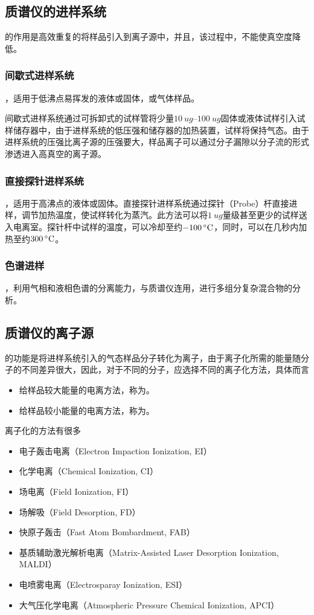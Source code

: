 \subsection{质谱仪的进样系统}
的作用是高效重复的将样品引入到离子源中，并且，该过程中，不能使真空度降低。

\subsubsection{间歇式进样系统}
，适用于低沸点易挥发的液体或固体，或气体样品。

间歇式进样系统通过可拆卸式的试样管将少量$\SIrange{10}{100}{ug}$固体或液体试样引入试样储存器中，由于进样系统的低压强和储存器的加热装置，试样将保持气态。由于进样系统的压强比离子源的压强要大，样品离子可以通过分子漏隙以分子流的形式渗透进入高真空的离子源。

\subsubsection{直接探针进样系统}
，适用于高沸点的液体或固体。直接探针进样系统通过探针（Probe）杆直接进样，调节加热温度，使试样转化为蒸汽。此方法可以将$\SI{1}{ug}$量级甚至更少的试样送入电离室。探针杆中试样的温度，可以冷却至约$\SI{-100}{\dc}$，同时，可以在几秒内加热至约$\SI{300}{\dc}$。

\subsubsection{色谱进样}
，利用气相和液相色谱的分离能力，与质谱仪连用，进行多组分复杂混合物的分析。

\subsection{质谱仪的离子源}
的功能是将进样系统引入的气态样品分子转化为离子，由于离子化所需的能量随分子的不同差异很大，因此，对于不同的分子，应选择不同的离子化方法，具体而言
\begin{itemize}
    \item 给样品较大能量的电离方法，称为。
    \item 给样品较小能量的电离方法，称为。
\end{itemize}
离子化的方法有很多
\begin{itemize}
    \item 电子轰击电离（Electron Impaction Ionization, EI）
    \item 化学电离（Chemical Ionization, CI）
    \item 场电离（Field Ionization, FI）
    \item 场解吸（Field Desorption, FD）
    \item 快原子轰击（Fast Atom Bombardment, FAB）
    \item 基质辅助激光解析电离（Matrix-Assisted Laser Desorption Ionization, MALDI）
    \item 电喷雾电离（Electrosparay Ionization, ESI）
    \item 大气压化学电离（Atmospheric Pressure Chemical Ionization, APCI）
\end{itemize}

